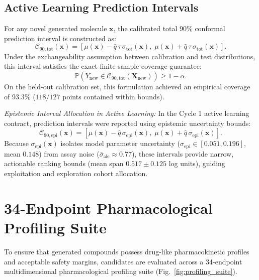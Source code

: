\documentclass[journal]{IEEEtran}
\begin{document}
\subsection{Active Learning Prediction Intervals}
For any novel generated molecule $\mathbf{x}$, the calibrated total 90\% conformal prediction interval is constructed as:
\begin{equation}
    \mathcal{C}_{90, \text{tot}}(\mathbf{x}) = \left[ \mu(\mathbf{x}) - \hat{q}\,\tau\,\sigma_{\text{tot}}(\mathbf{x}), \; \mu(\mathbf{x}) + \hat{q}\,\tau\,\sigma_{\text{tot}}(\mathbf{x}) \right].
\end{equation}
Under the exchangeability assumption between calibration and test distributions, this interval satisfies the exact finite-sample coverage guarantee:
\begin{equation}
    \mathbb{P}\left( Y_{\text{new}} \in \mathcal{C}_{90, \text{tot}}(\mathbf{X}_{\text{new}}) \right) \ge 1 - \alpha.
\end{equation}
On the held-out calibration set, this formulation achieved an empirical coverage of 93.3\% ($118/127$ points contained within bounds).

\textit{Epistemic Interval Allocation in Active Learning:} In the Cycle 1 active learning contract, prediction intervals were reported using epistemic uncertainty bounds:
\begin{equation}
    \mathcal{C}_{90, \text{epi}}(\mathbf{x}) = \left[ \mu(\mathbf{x}) - \hat{q}\,\sigma_{\text{epi}}(\mathbf{x}), \; \mu(\mathbf{x}) + \hat{q}\,\sigma_{\text{epi}}(\mathbf{x}) \right].
\end{equation}
Because $\sigma_{\text{epi}}(\mathbf{x})$ isolates model parameter uncertainty ($\sigma_{\text{epi}} \in [0.051, 0.196]$, mean $0.148$) from assay noise ($\bar{\sigma}_{\text{ale}} \approx 0.77$), these intervals provide narrow, actionable ranking bounds (mean span $0.517 \pm 0.125$ log units), guiding exploitation and exploration cohort allocation.

\section{34-Endpoint Pharmacological Profiling Suite}

To ensure that generated compounds possess drug-like pharmacokinetic profiles and acceptable safety margins, candidates are evaluated across a 34-endpoint multidimensional pharmacological profiling suite (Fig.~\ref{fig:profiling_suite}).
\end{document}
